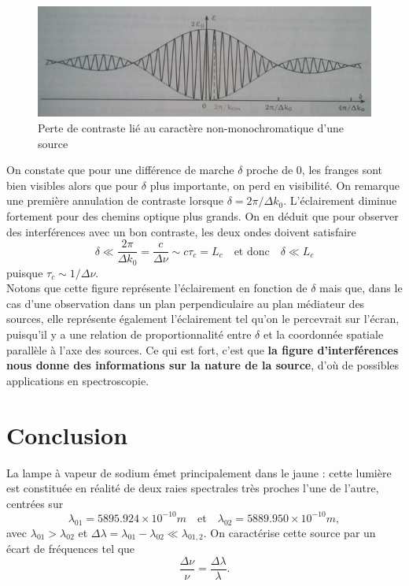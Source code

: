 \documentclass[11pt,a4paper]{report}
\begin{document}
\begin{figure}[h!]
	\begin{center}
		\includegraphics[scale = 0.6]{sourcenonmono.png}
	\end{center}
	\caption{Perte de contraste lié au caractère non-monochromatique d'une source}
\end{figure}

On constate que pour une différence de marche $\delta$ proche de 0, les franges sont bien visibles alors que pour $\delta$ plus importante, on perd en visibilité. On remarque une première annulation de contraste lorsque $\delta = 2\pi/\Delta k_0$. L'éclairement diminue fortement pour des chemins optique plus grands. On en déduit que pour observer des interférences avec un bon contraste, les deux ondes doivent satisfaire
\begin{equation}
	\delta \ll \frac{2\pi}{\Delta k_0} = \frac{c}{\Delta\nu} \sim c\tau_c = L_c 
	\quad\text{et donc}\quad\delta \ll L_c
\end{equation}
puisque $\tau_c \sim 1/\Delta \nu$.\\

Notons que cette figure représente l'éclairement en fonction de $\delta$ mais que, dans le cas d'une observation dans un plan perpendiculaire au plan médiateur des sources, elle représente également l'éclairement tel qu'on le percevrait sur l'écran, puisqu'il y a une relation de proportionnalité entre $\delta$ et la coordonnée spatiale parallèle à l'axe des sources. Ce qui est fort, c'est que \textbf{la figure d'interférences nous donne des informations sur la nature de la source}, d'où de possibles applications en spectroscopie.

\section*{Conclusion}

La lampe à vapeur de sodium émet principalement dans le jaune : cette lumière est constituée en réalité de deux raies spectrales très proches l'une de l'autre, centrées sur
\begin{equation}
	\lambda_{01} = 5895.924\times 10^{-10} m \quad\text{et}\quad 
	\lambda_{02} = 5889.950\times 10^{-10} m,
\end{equation}
avec $\lambda_{01} > \lambda_{02}$ et $\Delta\lambda = \lambda_{01}-\lambda_{02}\ll\lambda_{01,2}$. On caractérise cette source par un écart de fréquences tel que
\begin{equation}
	\frac{\Delta \nu}{\nu} = \frac{\Delta \lambda}{\lambda}.
\end{equation}
\end{document}

